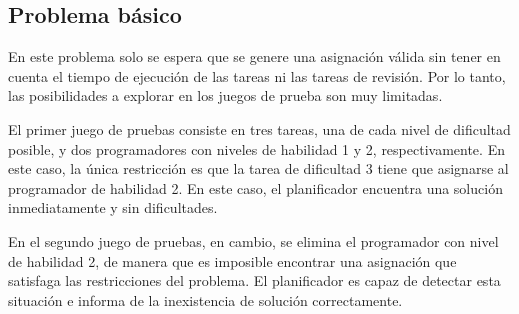 
\subsection{Problema básico} \label{sec:res-basico}

En este problema solo se espera que se genere una asignación válida sin tener 
en cuenta el tiempo de ejecución de las tareas ni las tareas de revisión. Por 
lo tanto, las posibilidades a explorar en los juegos de prueba son muy 
limitadas. 

El primer juego de pruebas consiste en tres tareas, una de cada nivel de 
dificultad posible, y dos programadores con niveles de habilidad 1 y 2, 
respectivamente. En este caso, la única restricción es que la tarea de 
dificultad 3 tiene que asignarse al programador de habilidad 2. En este caso, 
el planificador encuentra una solución inmediatamente y sin dificultades.

En el segundo juego de pruebas, en cambio, se elimina el programador con 
nivel de habilidad 2, de manera que es imposible encontrar una asignación que 
satisfaga las restricciones del problema. El planificador es capaz de detectar 
esta situación e informa de la inexistencia de solución correctamente.





